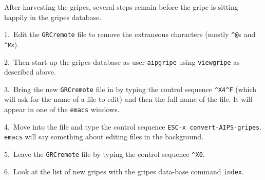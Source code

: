 After harvesting the gripes, several steps remain before the gripe is
sitting happily in the gripes database.
\begin{description}
\item{1.}\ Edit the {\tt GRCremote} file to remove the extraneous
           characters (mostly {\tt \^{ }@}s and {\tt \^{ }M}s).
\item{2.}\ Then start up the gripes database as user {\tt aipgripe}
           using {\tt viewgripe} as described above.
\item{3.}\ Bring the new {\tt GRCremote} file in by typing the control
           sequence {\tt \^{ }X4\^{ }F} (which will ask for the name
           of a file to edit) and then the full name of the file.  It
           will appear in one of the {\tt emacs} windows.
\item{4.}\ Move into the file and type the control sequence {\tt ESC-x
           convert-AIPS-gripes}.  {\tt emacs} will say something about
           editing files in the background.
\item{5.}\ Leave the {\tt GRCremote} file by typing the control
           sequence {\tt \^{ }X0}.
\item{6.}\ Look at the list of new gripes with the gripes data-base
           command {\tt index}.
\end{description}


